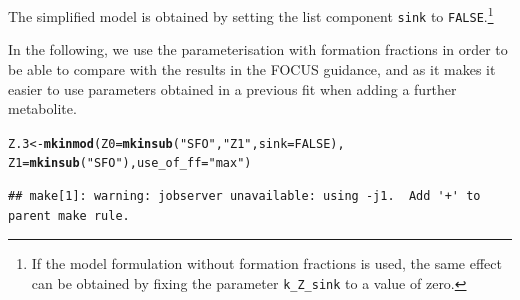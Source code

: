 \documentclass[12pt,a4paper]{article}\usepackage[]{graphicx}\usepackage[]{color}
\makeatletter
\newcommand{\hlnum}[1]{\textcolor[rgb]{0.686,0.059,0.569}{#1}}%
\newcommand{\hlstr}[1]{\textcolor[rgb]{0.192,0.494,0.8}{#1}}%
\newcommand{\hlstd}[1]{\textcolor[rgb]{0.345,0.345,0.345}{#1}}%
\newcommand{\hlkwb}[1]{\textcolor[rgb]{0.69,0.353,0.396}{#1}}%
\newcommand{\hlkwc}[1]{\textcolor[rgb]{0.333,0.667,0.333}{#1}}%
\newcommand{\hlkwd}[1]{\textcolor[rgb]{0.737,0.353,0.396}{\textbf{#1}}}%
\newenvironment{kframe}{%
 \def\at@end@of@kframe{}%
 \ifinner\ifhmode%
  \def\at@end@of@kframe{\end{minipage}}%
  \begin{minipage}{\columnwidth}%
 \fi\fi%
 \def\FrameCommand##1{\hskip\@totalleftmargin \hskip-\fboxsep
 \colorbox{shadecolor}{##1}\hskip-\fboxsep
     \hskip-\linewidth \hskip-\@totalleftmargin \hskip\columnwidth}%
 \MakeFramed {\advance\hsize-\width
   \@totalleftmargin\z@ \linewidth\hsize
   \@setminipage}}%
 {\par\unskip\endMakeFramed%
 \at@end@of@kframe}
\newenvironment{knitrout}{}{} %
\makeatother
\begin{document}
The simplified model is obtained by setting the list component \texttt{sink} to
\texttt{FALSE}.\footnote{If the model formulation without formation fractions
is used, the same effect can be obtained by fixing the parameter \texttt{k\_Z\_sink}
to a value of zero.} 

In the following, we use the parameterisation with formation fractions in order
to be able to compare with the results in the FOCUS guidance, and as it 
makes it easier to use parameters obtained in a previous fit when adding a further 
metabolite.

\begin{knitrout}
\color{fgcolor}\begin{kframe}
\begin{alltt}
\hlstd{Z.3} \hlkwb{<-} \hlkwd{mkinmod}\hlstd{(}\hlkwc{Z0} \hlstd{=} \hlkwd{mkinsub}\hlstd{(}\hlstr{"SFO"}\hlstd{,} \hlstr{"Z1"}\hlstd{,} \hlkwc{sink} \hlstd{=} \hlnum{FALSE}\hlstd{),}
               \hlkwc{Z1} \hlstd{=} \hlkwd{mkinsub}\hlstd{(}\hlstr{"SFO"}\hlstd{),} \hlkwc{use_of_ff} \hlstd{=} \hlstr{"max"}\hlstd{)}
\end{alltt}
\begin{verbatim}
## make[1]: warning: jobserver unavailable: using -j1.  Add '+' to parent make rule.
\end{verbatim}



\end{kframe}
\end{knitrout}
\end{document}
